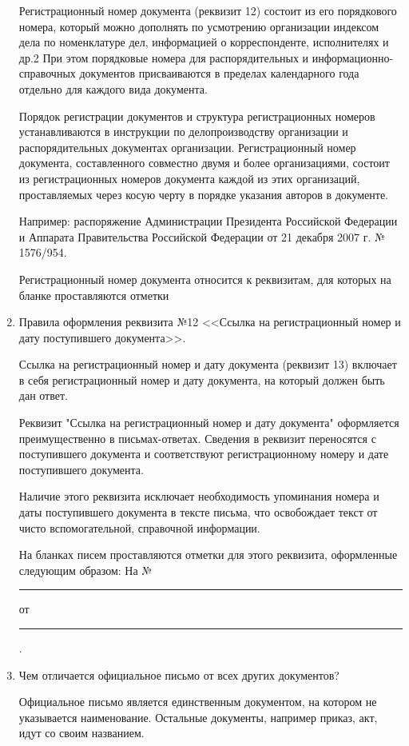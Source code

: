\documentclass[a4paper,10pt]{article}
\theoremstyle{plain} %
\theoremstyle{definition} %
\theoremstyle{remark} %
\begin{document}
\begin{enumerate}
	Регистрационный номер документа (реквизит 12) состоит из его порядкового номера, который можно дополнять по усмотрению организации индексом дела по номенклатуре дел, информацией о корреспонденте, исполнителях и др.2 При этом порядковые номера для распорядительных и информационно-справочных документов присваиваются в пределах календарного года отдельно для каждого вида документа.
	
	Порядок регистрации документов и структура регистрационных номеров устанавливаются в инструкции по делопроизводству организации и распорядительных документах организации.
	Регистрационный номер документа, составленного совместно двумя и более организациями, состоит из регистрационных номеров документа каждой из этих организаций, проставляемых через косую черту в порядке указания авторов в документе.
	
	Например: распоряжение Администрации Президента Российской Федерации и Аппарата Правительства Российской Федерации от 21 декабря 2007 г. № 1576/954.
	
	Регистрационный номер документа относится к реквизитам, для которых на бланке проставляются отметки
	

	\item Правила оформления реквизита №12 <<Ссылка на регистрационный номер и дату поступившего документа>>.
	
	Ссылка на регистрационный номер и дату документа (реквизит 13) включает в себя регистрационный номер и дату документа, на который должен быть дан ответ.
	
	Реквизит "Ссылка на регистрационный номер и дату документа" оформляется преимущественно в письмах-ответах. Сведения в реквизит переносятся с поступившего документа и соответствуют регистрационному номеру и дате поступившего документа.
	
	Наличие этого реквизита исключает необходимость упоминания номера и даты поступившего документа в тексте письма, что освобождает текст от чисто вспомогательной, справочной информации. 
	
	На бланках писем проставляются отметки для этого реквизита, оформленные следующим образом: На № \rule{3em}{.1pt} от\rule{3em}{.1pt}.
	

	\item Чем отличается официальное письмо от всех других документов?
	
	Официальное письмо является единственным документом, на котором не указывается наименование. Остальные документы, например приказ, акт, идут со своим названием.


\end{enumerate}
\end{document}
